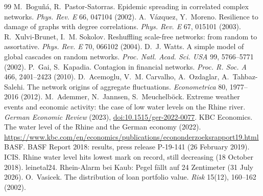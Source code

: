 \documentclass[11pt,a4paper]{article}
\theoremstyle{definition}
\theoremstyle{remark}
\begin{document}
\begin{thebibliography}{99}
 M.~Bogu\~n\'a, R.~Pastor-Satorras. Epidemic spreading in correlated complex networks. \textit{Phys. Rev. E} 66, 047104 (2002).
 A.~V\'azquez, Y.~Moreno. Resilience to damage of graphs with degree correlations. \textit{Phys. Rev. E} 67, 015101 (2003).
 R.~Xulvi-Brunet, I.~M. Sokolov. Reshuffling scale-free networks: from random to assortative. \textit{Phys. Rev. E} 70, 066102 (2004).
 D.~J. Watts. A simple model of global cascades on random networks. \textit{Proc. Natl. Acad. Sci. USA} 99, 5766--5771 (2002).
 P.~Gai, S.~Kapadia. Contagion in financial networks. \textit{Proc. R. Soc. A} 466, 2401--2423 (2010).
 D.~Acemoglu, V.~M. Carvalho, A.~Ozdaglar, A.~Tahbaz-Salehi. The network origins of aggregate fluctuations. \textit{Econometrica} 80, 1977--2016 (2012).
 M.~Ademmer, N.~Jannsen, S.~Meuchelb\"ock. Extreme weather events and economic activity: the case of low water levels on the Rhine river. \textit{German Economic Review} (2023), \href{https://doi.org/10.1515/ger-2022-0077}{doi:10.1515/ger-2022-0077}.
 KBC Economics. The water level of the Rhine and the German economy (2022). \url{https://www.kbc.com/en/economics/publications/econonderzoeksrapport19.html}
 BASF. BASF Report 2018: results, press release P-19-141 (26 February 2019).
 ICIS. Rhine water level hits lowest mark on record, still decreasing (18 October 2018).
 leinetal24. Rhein-Alarm bei Kaub: Pegel f\"allt auf 24 Zentimeter (31 July 2026).
 O.~Vasicek. The distribution of loan portfolio value. \textit{Risk} 15(12), 160--162 (2002).
\end{thebibliography}
\end{document}
